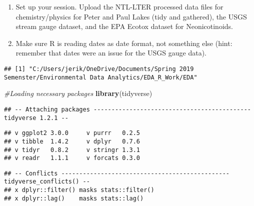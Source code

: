 \documentclass[]{article}
\newenvironment{Shaded}{\begin{snugshade}}{\end{snugshade}}
\newcommand{\KeywordTok}[1]{\textcolor[rgb]{0.13,0.29,0.53}{\textbf{#1}}}
\newcommand{\StringTok}[1]{\textcolor[rgb]{0.31,0.60,0.02}{#1}}
\newcommand{\CommentTok}[1]{\textcolor[rgb]{0.56,0.35,0.01}{\textit{#1}}}
\newcommand{\NormalTok}[1]{#1}
\begin{document}
\begin{enumerate}
\def\labelenumi{\arabic{enumi}.}
\item
  Set up your session. Upload the NTL-LTER processed data files for
  chemistry/physics for Peter and Paul Lakes (tidy and gathered), the
  USGS stream gauge dataset, and the EPA Ecotox dataset for
  Neonicotinoids.
\item
  Make sure R is reading dates as date format, not something else (hint:
  remember that dates were an issue for the USGS gauge data).
\end{enumerate}

\begin{Shaded}
\end{Shaded}

\begin{verbatim}
## [1] "C:/Users/jerik/OneDrive/Documents/Spring 2019 Semenster/Environmental Data Analytics/EDA_R_Work/EDA"
\end{verbatim}

\begin{Shaded}
\begin{Highlighting}[]
\CommentTok{#Loading necessary packages}
\KeywordTok{library}\NormalTok{(tidyverse)}
\end{Highlighting}
\end{Shaded}

\begin{verbatim}
## -- Attaching packages -------------------------------------------- tidyverse 1.2.1 --
\end{verbatim}

\begin{verbatim}
## v ggplot2 3.0.0     v purrr   0.2.5
## v tibble  1.4.2     v dplyr   0.7.6
## v tidyr   0.8.2     v stringr 1.3.1
## v readr   1.1.1     v forcats 0.3.0
\end{verbatim}

\begin{verbatim}
## -- Conflicts ----------------------------------------------- tidyverse_conflicts() --
## x dplyr::filter() masks stats::filter()
## x dplyr::lag()    masks stats::lag()
\end{verbatim}
\end{document}
